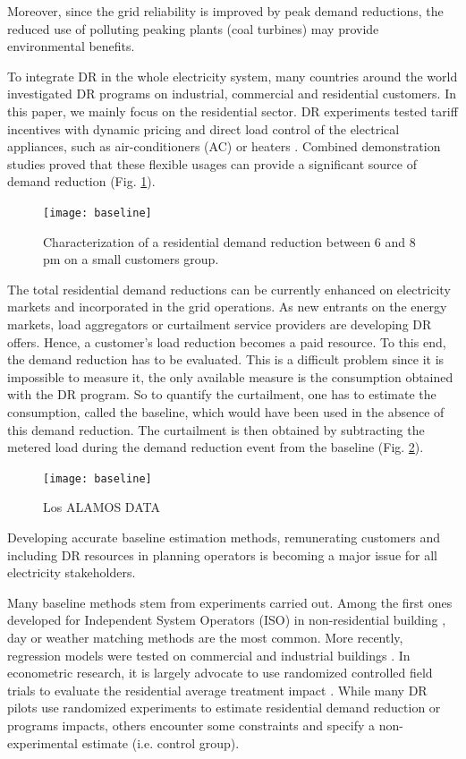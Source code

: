 \documentclass[journal]{IEEEtran}
\begin{document}
\noindent Moreover, since the grid reliability is improved by peak demand reductions,
the reduced use of polluting peaking plants (coal turbines) may provide environmental benefits.

To integrate DR in the whole electricity system, many countries around the world 
investigated DR programs on industrial, commercial and residential customers. In 
this paper, we mainly focus on the residential sector. DR experiments 
tested tariff incentives with dynamic pricing \cite{REX_DP} and direct load control 
of the electrical appliances, such as air-conditioners (AC) or heaters \cite{DECC_literature}.
Combined demonstration studies proved that these flexible usages 
can provide a significant source of demand reduction \cite{Rex_baseline} (Fig. \ref{effacement}).
\begin{figure}[!h]
\centering
\texttt{[image: baseline]} 
\caption{{\scriptsize Characterization of a residential demand reduction between 6 and 8 pm on 
a small customers group.}}
\label{effacement}
\end{figure}

The total residential demand reductions can be currently enhanced on electricity 
markets and incorporated in the grid operations. As new entrants on the energy markets, load 
aggregators or curtailment service providers are developing DR offers. Hence, a customer's 
load reduction becomes a paid resource. To this end, the demand reduction has to be 
evaluated. This is a difficult problem
since it is impossible to measure it, the only available measure is the consumption obtained
with the DR program. So to quantify the curtailment, one has to estimate the 
consumption, called the baseline, which would have been used in the absence of this demand 
reduction. The curtailment is then obtained by subtracting the metered load during the 
demand reduction event from the baseline (Fig. \ref{baseline}). 
\begin{figure}[!h]
\centering
\texttt{[image: baseline]} 
\caption{{\scriptsize Los ALAMOS DATA}}
\label{baseline}
\end{figure}
Developing accurate baseline estimation methods, remunerating customers and 
including DR resources in planning operators is becoming a major issue for all electricity 
stakeholders.  

Many baseline methods stem from experiments carried out. Among the first ones developed 
for Independent System Operators (ISO) in non-residential building \cite{eval_baseline}, day or
weather matching methods are the most common. More recently, regression models were tested on
commercial and industrial buildings \cite{quantifying_berk}. 
In econometric research, it is largely advocate to use randomized controlled field trials
to evaluate the residential average treatment impact \cite{energy_efficiency_gap}.
While many DR pilots use randomized experiments to estimate residential demand reduction
or programs impacts, others encounter some constraints and specify a non-experimental
estimate (i.e. control group). 
\end{document}
